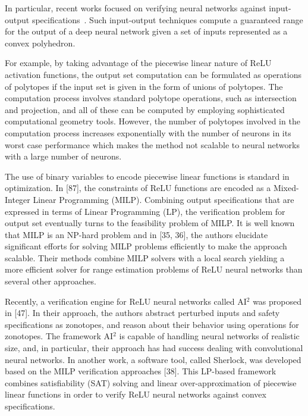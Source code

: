 In particular, recent works focused on verifying neural networks against input-output specifications~\cite{katz2017reluplex,ehlers2017formal,bunel2018unified,ruan2018reachability,dutta2017output,pulina2010abstraction}. Such input-output techniques compute a guaranteed range for the output of a deep neural network given a set of inputs represented as a convex polyhedron. 

For example, by taking advantage of the piecewise linear nature of ReLU activation functions, the output set computation can be formulated as operations of polytopes if the input set is given in the form of unions of polytopes. The computation process involves standard polytope operations, such as intersection and projection, and all of these can be computed by employing sophisticated computational geometry tools. However, the number of polytopes involved in the computation process increases exponentially with the number of neurons in its worst case performance which makes the method not scalable to neural networks with a large number of neurons.


The use of binary variables to encode piecewise linear functions is standard
in optimization. In [87], the constraints of ReLU functions are encoded
as a Mixed-Integer Linear Programming (MILP). Combining output specifications that are expressed in terms of Linear Programming (LP), the verification problem for output set eventually turns to the feasibility problem of MILP. It is well known that MILP is an NP-hard problem and in [35, 36], the authors elucidate significant efforts for solving MILP problems efficiently to make the approach scalable. Their methods combine MILP solvers with a local search yielding a more efficient solver for range estimation problems of ReLU neural networks than several other approaches. 

Recently, a verification engine for ReLU neural networks called AI$^2$ was proposed in [47]. In their approach, the authors abstract perturbed inputs and safety specifications as zonotopes, and reason about their behavior using operations for zonotopes. The framework AI$^2$ is capable of handling neural networks of realistic size, and, in particular, their approach has had success dealing with convolutional neural networks. In another work, a software tool, called Sherlock, was developed based on the MILP verification approaches [38]. This LP-based framework combines satisfiability (SAT) solving and linear over-approximation of piecewise linear functions in order to verify ReLU neural networks against convex specifications.


